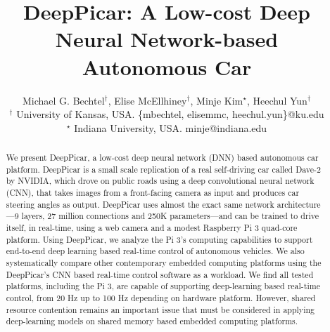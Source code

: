 \documentclass[conference]{IEEEtran}
\begin{document}
\title{DeepPicar: A Low-cost Deep Neural Network-based Autonomous Car}

\author{Michael G. Bechtel$^\dagger$, Elise McEllhiney$^\dagger$, Minje Kim$^\star$, Heechul Yun$^\dagger$\\
  $^\dagger$ University of Kansas, USA. \{mbechtel, elisemmc, heechul.yun\}@ku.edu \\
  $^\star$ Indiana University, USA. minje@indiana.edu \\
}


\maketitle

\begin{abstract}
We present DeepPicar, a low-cost deep neural network (DNN) based
autonomous car platform. DeepPicar is a small scale
replication of a real self-driving car called Dave-2 by NVIDIA, which
drove on public roads using a deep convolutional neural network (CNN), 
that takes images from a front-facing camera as input and produces
car steering angles as output. DeepPicar uses almost the exact same 
network architecture---9 layers, 27 million connections and 250K
parameters---and can be trained to drive itself, in real-time, using a
web camera and a modest Raspberry Pi 3 quad-core platform.
Using DeepPicar, we analyze the Pi 3's computing capabilities to 
support end-to-end deep learning based real-time control of autonomous
vehicles. We also systematically compare other contemporary embedded
computing platforms using the DeepPicar's CNN based real-time control
software as a workload. 
We find all tested platforms, including the Pi 3, are capable of
supporting deep-learning based real-time control, from 20 Hz up to 100
Hz depending on hardware platform. 
However, shared resource contention remains an
important issue that must be considered in applying deep-learning
models on shared memory based embedded computing platforms.
\end{abstract}
\end{document}
